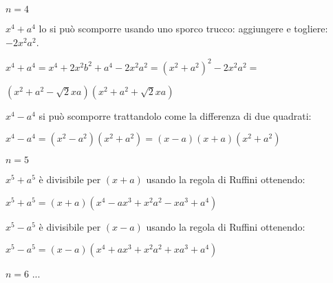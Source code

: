 \begin{itemize*}
 \item $n=4$
 \begin{itemize*}
  \item $x^4+a^4$ lo si può scomporre usando uno sporco trucco: 
   aggiungere e togliere:~$-2x^2a^2$.
   
   $x^4+a^4 = x^4+2x^2b^2+a^4-2x^2a^2 = (x^2+a^2)^2-2x^2a^2=$
   
   $\left(x^2+a^2-\sqrt{2}xa\right)\left(x^2+a^2+\sqrt{2}xa\right)$
   
  \item $x^4-a^4$ si può scomporre trattandolo come la differenza di due 
   quadrati:
   
   $x^4-a^4 = (x^2-a^2)(x^2+a^2) = (x-a)(x+a)(x^2+a^2) $
 \end{itemize*}

 \item $n=5$
 \begin{itemize*}
  \item $x^5+a^5$ è divisibile per $(x+a)$ usando la regola di Ruffini
   ottenendo: 
   
   $x^5+a^5=(x+a)(x^4-ax^3+x^2a^2-xa^3+a^4)$
   
  \item $x^5-a^5$ è divisibile per $(x-a)$ usando la regola di Ruffini
   ottenendo: 
   
   $x^5-a^5=(x-a)(x^4+ax^3+x^2a^2+xa^3+a^4)$
   
 \end{itemize*}

 \item $n=6$ ...
 
\end{itemize*}

